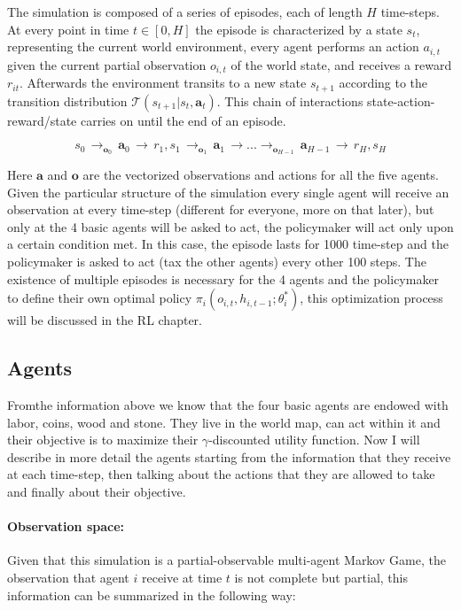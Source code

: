 The simulation is composed of a series of episodes, each of length \( H \) time-steps. At every point in time \( t \in [0,H] \) the episode is characterized by a state \( s_t \), representing the current world environment, every agent performs an action \( a_{i,t}  \)  given the current partial observation \( o_{i,t}\) of the world state, and receives a reward \( r_{it}  \). Afterwards the environment transits to a new state \( s_{t+1} \) according to the transition distribution \(  \mathcal{T}(s_{t+1}|s_t,\boldsymbol{a}_t)\). This chain of interactions state-action-reward/state carries on until the end of an episode.

\begin{equation*}
     s_0 \,  \rightarrow_{\boldsymbol{o}_0}\, \boldsymbol{a}_0 \,\rightarrow\, r_1 , s_1 \,\rightarrow_{\boldsymbol{o}_1}\, \boldsymbol{a}_1 \,\rightarrow ... \rightarrow_{\boldsymbol{o}_{H-1}}\, \boldsymbol{a}_{H-1} \,\rightarrow\, r_H , s_H
\end{equation*}

Here \( \boldsymbol{a} \) and \( \boldsymbol{o} \) are the vectorized observations and actions for all the five agents. Given the particular structure of the simulation every single agent will receive an observation at every time-step (different for everyone, more on that later), but only at the 4 basic agents will be asked to act, the policymaker will act only upon a certain condition met. In this case, the episode lasts for 1000 time-step and the policymaker is asked to act (tax the other agents) every other 100 steps. The existence of multiple episodes is necessary for the 4 agents and the policymaker to define their own optimal policy \( \pi_i(o_{i,t}, h_{i,t-1};\theta_i^*) \), this optimization process will be discussed in the RL chapter.

\subsection{Agents}

Fromthe information above we know that the four basic agents are endowed with labor, coins, wood and stone. They live in the world map, can act within it and their objective is to maximize their $\gamma$-discounted utility function. Now I will describe in more detail the agents starting from the information that they receive at each time-step, then talking about the actions that they are allowed to take and finally about their objective. 

\paragraph{Observation space:} Given that this simulation is a partial-observable multi-agent Markov Game, the observation that agent \( i \) receive at time \( t \) is not complete but partial, this information can be summarized in the following way:

